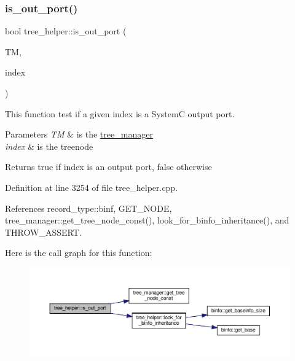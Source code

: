 \subsubsection{\texorpdfstring{is\+\_\+out\+\_\+port()}{is\_out\_port()}}
{\footnotesize\ttfamily bool tree\+\_\+helper\+::is\+\_\+out\+\_\+port (\begin{DoxyParamCaption}\item[{const \hyperlink{tree__manager_8hpp_a792e3f1f892d7d997a8d8a4a12e39346}{tree\+\_\+manager\+Const\+Ref} \&}]{TM,  }\item[{const unsigned int}]{index }\end{DoxyParamCaption})\hspace{0.3cm}{\ttfamily [static]}}



This function test if a given index is a SystemC output port. 


\begin{DoxyParams}{Parameters}
{\em TM} & is the \hyperlink{classtree__manager}{tree\+\_\+manager} \\
\hline
{\em index} & is the treenode \\
\hline
\end{DoxyParams}
\begin{DoxyReturn}{Returns}
true if index is an output port, false otherwise 
\end{DoxyReturn}


Definition at line 3254 of file tree\+\_\+helper.\+cpp.



References record\+\_\+type\+::binf, G\+E\+T\+\_\+\+N\+O\+DE, tree\+\_\+manager\+::get\+\_\+tree\+\_\+node\+\_\+const(), look\+\_\+for\+\_\+binfo\+\_\+inheritance(), and T\+H\+R\+O\+W\+\_\+\+A\+S\+S\+E\+RT.

Here is the call graph for this function\+:
\nopagebreak
\begin{figure}[H]
\begin{center}
\leavevmode
\includegraphics[width=350pt]{d7/d99/classtree__helper_a28c813825d5b4e548775c72d511af4eb_cgraph}
\end{center}
\end{figure}
\mbox{\label{classtree__helper_abc76c244562398090b0f0341d0f92dae}} 
